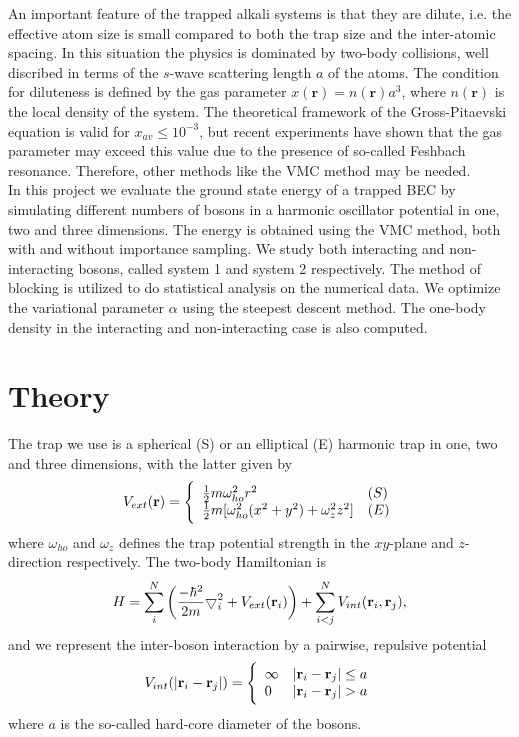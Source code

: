 \documentclass[english, a4paper]{article}
\begin{document}
\noindent An important feature of the trapped alkali systems is that they are dilute, i.e. the effective atom size
is small compared to both the trap size and the inter-atomic spacing. In this situation the physics is
dominated by two-body collisions, well discribed in terms of the $s$-wave scattering length $a$ of the atoms.
The condition for diluteness is defined by the gas parameter $x(\mathbf{r}) = n(\mathbf{r})a^3$, where $n(\mathbf{r})$
is the local density of the system. The theoretical framework of the Gross-Pitaevski equation is valid for $x_{av} \leq 10^{-3}$,
but recent experiments have shown that the gas parameter may exceed this value due to the presence of so-called Feshbach resonance.
Therefore, other methods like the VMC method may be needed. \\

\noindent In this project we evaluate the ground state energy of a trapped BEC by simulating different numbers of bosons
in a harmonic oscillator potential in one, two and three dimensions. The energy is obtained using the VMC method, both with 
and without importance sampling. We study both interacting and non-interacting bosons, called system 1
and system 2 respectively. The method of blocking is utilized to do statistical analysis on
the numerical data. We optimize the variational parameter $\alpha$ using the steepest descent method. The one-body 
density in the interacting and non-interacting case is also computed.



\section{Theory}
The trap we use is a spherical (S) or an elliptical (E) harmonic trap in one, two and three dimensions, with the latter given by
\begin{equation}
 V_{ext}({\bf r}) = 
 \Bigg\{
\begin{array}{ll}
	 \frac{1}{2}m\omega_{ho}^2r^2 & (S)\\
 \strut
	 \frac{1}{2}m[\omega_{ho}^2(x^2+y^2) + \omega_z^2z^2] & (E)
 \label{trap_eqn}
\end{array}
\end{equation}
where $\omega_{ho}$ and $\omega_z$ defines the trap potential strength in the $xy$-plane and $z$-direction respectively.
The two-body Hamiltonian is
 \begin{equation}
     H = \sum_i^N \left(
	 \frac{-\hbar^2}{2m}
	 { \bigtriangledown }_{i}^2 +
	 V_{ext}({\bf{r}}_i)\right)  +
	 \sum_{i<j}^{N} V_{int}({\bf{r}}_i,{\bf{r}}_j),
 \end{equation}
 and we represent the inter-boson interaction by a pairwise, repulsive potential
 \begin{equation}
 V_{int}(|{\bf r}_i-{\bf r}_j|) =  \Bigg\{
 \begin{array}{ll}
	 \infty & {|{\bf r}_i-{\bf r}_j|} \leq {a}\\
	 0 & {|{\bf r}_i-{\bf r}_j|} > {a}
 \end{array}
 \end{equation}
 where ${a}$ is the so-called hard-core diameter of the bosons.
 
\end{document}

